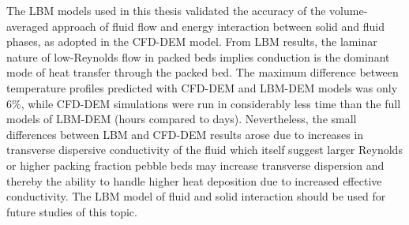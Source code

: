 {The LBM models used in this thesis validated the accuracy of the volume-averaged approach of fluid flow and energy interaction between solid and fluid phases, as adopted in the CFD-DEM model. From LBM results, the laminar nature of low-Reynolds flow in packed beds implies conduction is the dominant mode of heat transfer through the packed bed. The maximum difference between temperature profiles predicted with CFD-DEM and LBM-DEM models was only 6\%, while CFD-DEM simulations were run in considerably less time than the full models of LBM-DEM (hours compared to days). Nevertheless, the small differences between LBM and CFD-DEM results arose due to increases in transverse dispersive conductivity of the fluid which itself suggest larger Reynolds or higher packing fraction pebble beds may increase transverse dispersion and thereby the ability to handle higher heat deposition due to increased effective conductivity. The LBM model of fluid and solid interaction should be used for future studies of this topic.

}